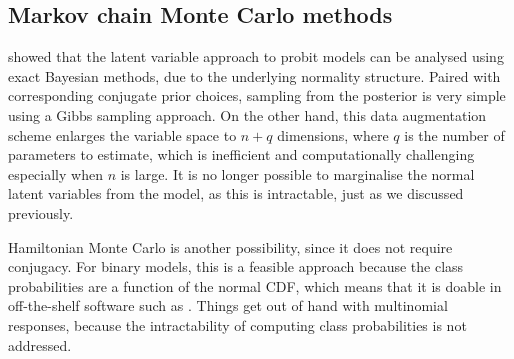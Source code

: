 %

\subsection{Markov chain Monte Carlo methods}

\citet{albert1993bayesian} showed that the latent variable approach to probit models can be analysed using exact Bayesian methods, due to the underlying normality structure.
Paired with corresponding conjugate prior choices, sampling from the posterior is very simple using a Gibbs sampling approach.
On the other hand, this data augmentation scheme enlarges the variable space to $n+q$ dimensions, where $q$ is the number of parameters to estimate, which is inefficient and computationally challenging especially when $n$ is large.
It is no longer possible to marginalise the normal latent variables from the model, as this is intractable, just as we discussed previously.

Hamiltonian Monte Carlo is another possibility, since it does not require conjugacy.
For binary models, this is a feasible approach because the class probabilities are a function of the normal CDF, which means that it is doable in off-the-shelf software such as .
Things get out of hand with multinomial responses, because the intractability of computing class probabilities is not addressed.

